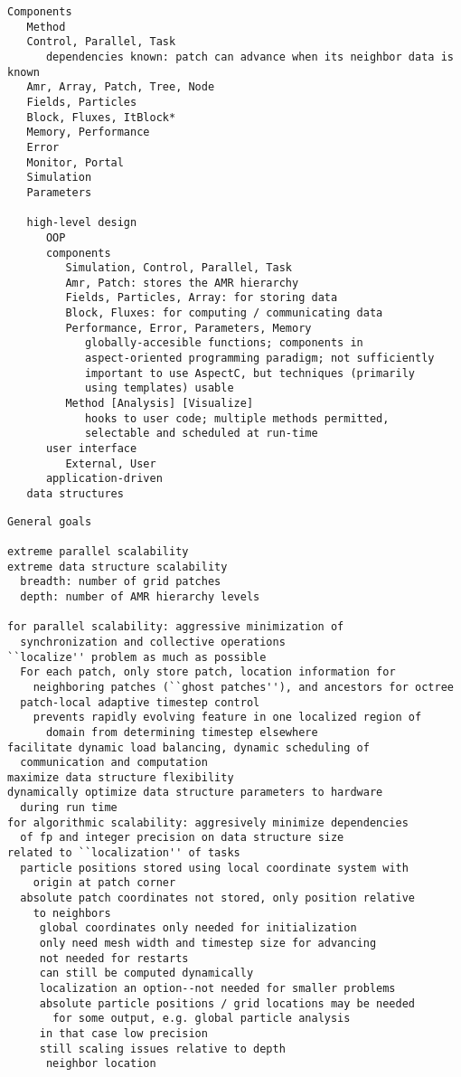 \documentclass[14pt,letter]{article}
\begin{document}
\begin{verbatim}
Components
   Method
   Control, Parallel, Task
      dependencies known: patch can advance when its neighbor data is known
   Amr, Array, Patch, Tree, Node 
   Fields, Particles
   Block, Fluxes, ItBlock*
   Memory, Performance
   Error
   Monitor, Portal
   Simulation
   Parameters

   high-level design
      OOP
      components
         Simulation, Control, Parallel, Task
         Amr, Patch: stores the AMR hierarchy
         Fields, Particles, Array: for storing data
         Block, Fluxes: for computing / communicating data
         Performance, Error, Parameters, Memory
            globally-accesible functions; components in
            aspect-oriented programming paradigm; not sufficiently
            important to use AspectC, but techniques (primarily
            using templates) usable
         Method [Analysis] [Visualize]
            hooks to user code; multiple methods permitted,
            selectable and scheduled at run-time
      user interface
         External, User
      application-driven
   data structures
\end{verbatim}

\begin{verbatim}
General goals

extreme parallel scalability
extreme data structure scalability
  breadth: number of grid patches
  depth: number of AMR hierarchy levels

for parallel scalability: aggressive minimization of
  synchronization and collective operations
``localize'' problem as much as possible
  For each patch, only store patch, location information for
    neighboring patches (``ghost patches''), and ancestors for octree
  patch-local adaptive timestep control
    prevents rapidly evolving feature in one localized region of
      domain from determining timestep elsewhere
facilitate dynamic load balancing, dynamic scheduling of
  communication and computation
maximize data structure flexibility
dynamically optimize data structure parameters to hardware
  during run time
for algorithmic scalability: aggresively minimize dependencies
  of fp and integer precision on data structure size
related to ``localization'' of tasks
  particle positions stored using local coordinate system with
    origin at patch corner
  absolute patch coordinates not stored, only position relative
    to neighbors
     global coordinates only needed for initialization
     only need mesh width and timestep size for advancing
     not needed for restarts
     can still be computed dynamically
     localization an option--not needed for smaller problems
     absolute particle positions / grid locations may be needed
       for some output, e.g. global particle analysis
     in that case low precision
     still scaling issues relative to depth
      neighbor location
\end{verbatim}
\end{document}
